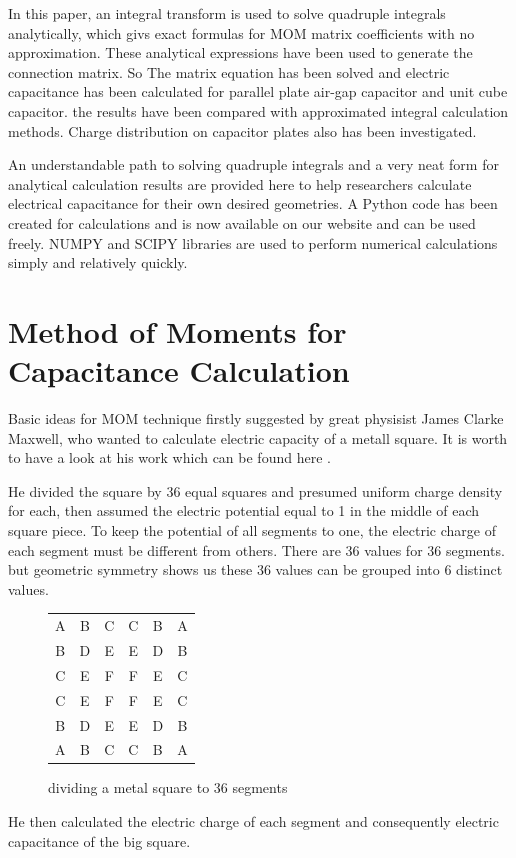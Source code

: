 \documentclass[final,5p,times,twocolumn]{elsarticle}
\begin{document}
In this paper, an integral transform is used to solve quadruple integrals analytically, which givs exact formulas for MOM matrix coefficients with no approximation. These analytical expressions have been used to generate the connection matrix. So The matrix equation has been solved and electric capacitance has been calculated for parallel plate air-gap capacitor and unit cube capacitor. the results have been compared with approximated integral calculation methods. Charge distribution on capacitor plates also has been investigated.

An understandable path to solving quadruple integrals and a very neat form for analytical calculation results are provided here to help researchers calculate electrical capacitance for their own desired geometries. A Python code has been created for calculations and is now available on our website and can be used freely. NUMPY and SCIPY libraries are used to perform numerical calculations simply and relatively quickly.
\section{Method of Moments for Capacitance Calculation}

Basic ideas for MOM technique firstly suggested by great physisist James Clarke Maxwell, who wanted to calculate electric capacity of a metall square. It is worth to have a look at his work which can be found here \cite {Cavendish1967}.

He divided the square by 36 equal squares and presumed uniform charge density for each, then assumed the electric potential equal to 1 in the middle of each square piece. To keep the potential of all segments to one, the electric charge of each segment must be different from others. There are 36 values for 36 segments. but geometric symmetry shows us these 36 values can be grouped into 6 distinct values.
\begin {figure}
\center
\begin{tabular}{ c c c c c c }
  A & B & C & C & B & A \\
  B & D & E & E & D & B \\
  C & E & F & F & E & C \\
  C & E & F & F & E & C \\
  B & D & E & E & D & B \\
  A & B & C & C & B & A \\
\end{tabular}
\caption{dividing a metal square to 36 segments}
\end{figure}
He then calculated the electric charge of each segment and consequently electric capacitance of the big square.
\end{document}

